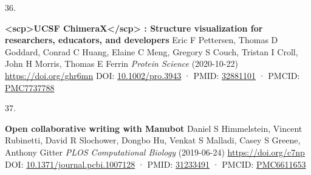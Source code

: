 \documentclass[
]{article}
\newlength{\cslhangindent}
\newlength{\csllabelwidth}
\newlength{\cslentryspacingunit} %
\newenvironment{CSLReferences}[2] %
 {%
  \setlength{\parindent}{0pt}
  \ifodd #1
  \let\oldpar\par
  \def\par{\hangindent=\cslhangindent\oldpar}
  \fi
  \setlength{\parskip}{#2\cslentryspacingunit}
 }%
 {}
\newcommand{\CSLBlock}[1]{#1\hfill\break}
\newcommand{\CSLLeftMargin}[1]{\parbox[t]{\csllabelwidth}{#1}}
\newcommand{\CSLRightInline}[1]{\parbox[t]{\linewidth - \csllabelwidth}{#1}\break}
\begin{document}
\begin{CSLReferences}{0}{0}
\leavevmode{}%
\CSLLeftMargin{36. }%
\CSLRightInline{\textbf{\textless scp\textgreater UCSF ChimeraX\textless/scp\textgreater{}
: Structure visualization for researchers, educators, and developers}
\CSLBlock{Eric F Pettersen, Thomas D Goddard, Conrad C Huang, Elaine C Meng, Gregory S Couch, Tristan I Croll, John H Morris, Thomas E Ferrin} \emph{Protein Science} (2020-10-22) \url{https://doi.org/ghr6mn}
\CSLBlock{DOI: \href{https://doi.org/10.1002/pro.3943}{10.1002/pro.3943} · PMID: \href{https://www.ncbi.nlm.nih.gov/pubmed/32881101}{32881101} · PMCID: \href{https://www.ncbi.nlm.nih.gov/pmc/articles/PMC7737788}{PMC7737788}}}

\leavevmode{}%
\CSLLeftMargin{37. }%
\CSLRightInline{\textbf{Open collaborative writing with Manubot}
\CSLBlock{Daniel S Himmelstein, Vincent Rubinetti, David R Slochower, Dongbo Hu, Venkat S Malladi, Casey S Greene, Anthony Gitter} \emph{PLOS Computational Biology} (2019-06-24) \url{https://doi.org/c7np}
\CSLBlock{DOI: \href{https://doi.org/10.1371/journal.pcbi.1007128}{10.1371/journal.pcbi.1007128} · PMID: \href{https://www.ncbi.nlm.nih.gov/pubmed/31233491}{31233491} · PMCID: \href{https://www.ncbi.nlm.nih.gov/pmc/articles/PMC6611653}{PMC6611653}}}

\end{CSLReferences}
\end{document}
